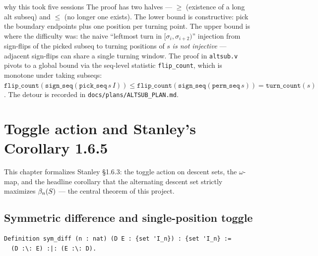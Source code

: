 \begin{sidebar}{why this took five sessions}
The proof has two halves --- $\geq$ (existence of a long alt
subseq) and $\leq$ (no longer one exists). The lower bound is
constructive: pick the boundary endpoints plus one position per
turning point. The upper bound is where the difficulty was: the
naive ``leftmost turn in $[\sigma_i, \sigma_{i+2})$'' injection
from sign-flips of the picked subseq to turning positions of $s$
\emph{is not injective} --- adjacent sign-flips can share a single
turning window. The proof in \texttt{altsub.v} pivots to a global
bound via the seq-level statistic
\texttt{flip\_count}, which is monotone under taking subseqs:
$\texttt{flip\_count}(\texttt{sign\_seq}(\texttt{pick\_seq}\,s\,I))
\leq \texttt{flip\_count}(\texttt{sign\_seq}(\texttt{perm\_seq}\,s))
= \texttt{turn\_count}(s)$. The detour is recorded in
\texttt{docs/plans/ALTSUB\_PLAN.md}.
\end{sidebar}

\clearpage

\chapter{Toggle action and Stanley's Corollary 1.6.5}
\label{ch:toggle}

This chapter formalizes Stanley \S1.6.3: the toggle action on
descent sets, the $\omega$-map, and the headline corollary that
the alternating descent set strictly maximizes $\beta_{n}(S)$ ---
the central theorem of this project.

\section{Symmetric difference and single-position toggle}

\begin{definition}
\end{definition}

\begin{lstlisting}[language=Rocq]
Definition sym_diff (n : nat) (D E : {set 'I_n}) : {set 'I_n} :=
  (D :\: E) :|: (E :\: D).
\end{lstlisting}


